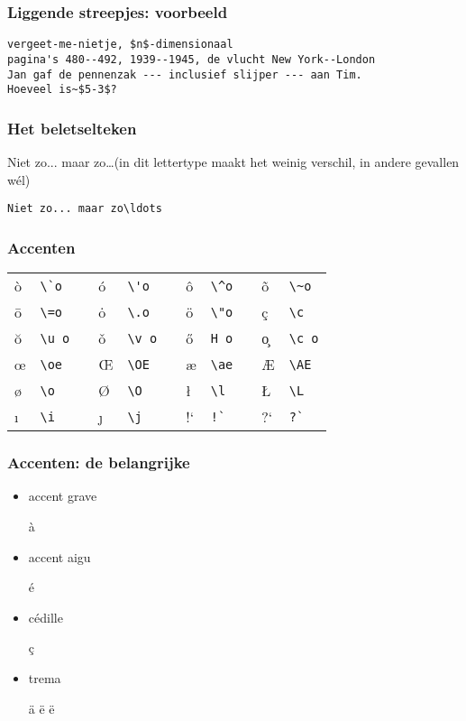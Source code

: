\begin{frame}[fragile]
  \frametitle{Liggende streepjes: voorbeeld}

  \begin{verbatim}
vergeet-me-nietje, $n$-dimensionaal
pagina's 480--492, 1939--1945, de vlucht New York--London
Jan gaf de pennenzak --- inclusief slijper --- aan Tim.
Hoeveel is~$5-3$?
  \end{verbatim}
\end{frame}

\begin{frame}[fragile]
  \frametitle{Het beletselteken}
  
  Niet zo... maar zo\ldots (in dit lettertype maakt het weinig verschil, in andere gevallen w\'el)
  \begin{verbatim}
Niet zo... maar zo\ldots
  \end{verbatim}
\end{frame}

\begin{frame}[fragile]
  \frametitle{Accenten}

  \begin{center}
    \begin{tabular}{lllllllllll}
      \`o & \verb|\`o| & & \'o & \verb|\'o| & & \^o & \verb|\^o| & & \~o & \verb|\~o| \\
      \=o & \verb|\=o| & & \.o & \verb|\.o| & & \"o & \verb|\"o| & & \c c & \verb|\c| \\
	  \u o & \verb|\u o| & & \v o & \verb|\v o| & & \H o & \verb|H o| & & \c o & \verb|\c o| \\
	  \oe & \verb|\oe| & & \OE & \verb|\OE| & & \ae & \verb|\ae| & & \AE & \verb|\AE| \\
	  \o & \verb|\o| & & \O & \verb|\O| & & \l & \verb|\l| & & \L & \verb|\L| \\
	  \i & \verb|\i| & & \j & \verb|\j| & & !` & \verb|!`| & & ?` & \verb|?`|
    \end{tabular}
  \end{center}
\end{frame}

\begin{frame}[fragile]
  \frametitle{Accenten: de belangrijke}

  \begin{itemize}
    \item accent grave
      \begin{LTXexample}
\`a
      \end{LTXexample}
    \item accent aigu
      \begin{LTXexample}
\'e
      \end{LTXexample}
    \item c\'edille
      \begin{LTXexample}
\c c
      \end{LTXexample}
    \item trema
      \begin{LTXexample}
\"a \"e \"{e}
      \end{LTXexample}
  \end{itemize}
\end{frame}

